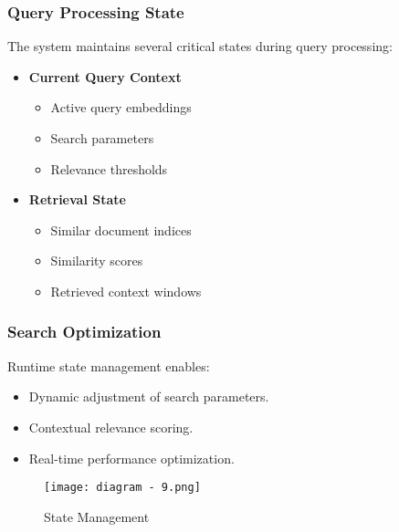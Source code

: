 \documentclass[12pt,a4paper]{report}
\begin{document}
\subsubsection*{Query Processing State}
The system maintains several critical states during query processing:
\begin{itemize}
    \item \textbf{Current Query Context}
    \begin{itemize}
        \item Active query embeddings
        \item Search parameters
        \item Relevance thresholds
    \end{itemize}
    \item \textbf{Retrieval State}
    \begin{itemize}
        \item Similar document indices
        \item Similarity scores
        \item Retrieved context windows
    \end{itemize}
\end{itemize}

\subsubsection*{Search Optimization}
Runtime state management enables:
\begin{itemize}
    \item Dynamic adjustment of search parameters.
    \item Contextual relevance scoring.
    \item Real-time performance optimization.
\end{itemize}


\begin{figure}[htbp]
    \centering
    \texttt{[image: diagram - 9.png]}
    \caption{State Management}
    \label{fig:state-management}
\end{figure}
\end{document}
